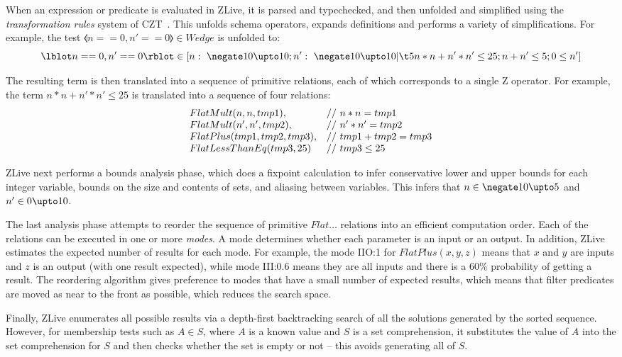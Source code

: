 \documentclass{llncs}
\begin{document}
When an expression or predicate is evaluated in ZLive, it is
parsed and typechecked, and then unfolded and simplified using
the \emph{transformation rules} system of CZT~\cite{utting:rules07}.
This unfolds schema operators, expands definitions and performs a
variety of simplifications.  For example, the test $\lblot n==0, n'==0
\rblot \in Wedge$ is unfolded to:
\[
  \lblot n == 0 , n' == 0 \rblot \in 
 [ n :~\negate 10 \upto 10; n' :~\negate 10 \upto 10 | \\
   \t5 n * n + n' * n'  \leq 25; n + n' \leq 5; 0 \leq n' ]
\]

The resulting term is then translated into a sequence of primitive
relations, each of which corresponds to a single Z operator.
For example, the term $n * n + n' * n'  \leq 25$ is 
translated into a sequence of four relations:
\[
\begin{array}{l@{\quad}l}
   FlatMult(n, n, tmp1),       & //~ n * n = tmp1 \\
   FlatMult(n', n', tmp2),     & //~ n' * n' = tmp2 \\
   FlatPlus(tmp1, tmp2, tmp3), & //~ tmp1 + tmp2 = tmp3 \\
   FlatLessThanEq(tmp3, 25)    & //~ tmp3 \leq 25
\end{array}
\]

ZLive next performs a bounds analysis phase, which does a fixpoint
calculation to infer conservative lower and upper bounds for each
integer variable, bounds on the size and contents of sets, and
aliasing between variables.  This infers that $n \in \negate 10 \upto
5$ and $n' \in 0 \upto 10$.

The last analysis phase attempts to reorder the sequence of primitive
$Flat\ldots$ relations into an efficient computation order.  Each of
the relations can be executed in one or more \emph{modes}.  A mode
determines whether each parameter is an input or an output.  In
addition, ZLive estimates the expected number of results for each
mode.  For example, the mode IIO:1 for $FlatPlus(x,y,z)$ means that
$x$ and $y$ are inputs and $z$ is an output (with one result
expected), while mode III:0.6 means they are all inputs and there is a
60\% probability of getting a result.  The reordering algorithm gives
preference to modes that have a small number of expected results,
which means that filter predicates are moved as near to the front as
possible, which reduces the search space.

Finally, ZLive enumerates all possible results via a depth-first 
backtracking search of all the solutions generated by the sorted sequence.
However, for membership tests such as $A \in S$, where $A$ is a known
value and $S$ is a set comprehension, it substitutes the value of $A$
into the set comprehension for $S$ and then checks whether the set is
empty or not -- this avoids generating all of $S$.
\end{document}
